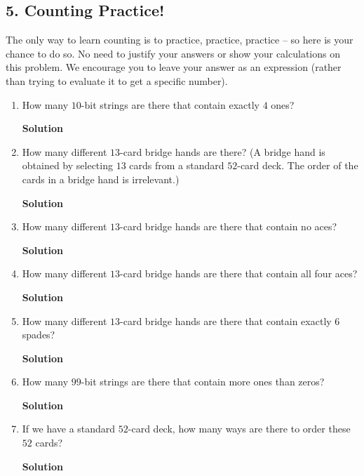 \documentclass{article}\usepackage{amsmath,amssymb,amsthm,tikz,tkz-graph,color,chngpage,soul,hyperref,csquotes,graphicx,floatrow}\newcommand*{\QEDB}{\hfill\ensuremath{\square}}\newtheorem*{prop}{Proposition}\renewcommand{\theenumi}{\alph{enumi}}\usepackage[shortlabels]{enumitem}\usepackage[nobreak=true]{mdframed}\usetikzlibrary{matrix,calc}\MakeOuterQuote{"}\usepackage[margin=0.75in]{geometry} \newtheorem{theorem}{Theorem}
\begin{document}
\subsection*{5. Counting Practice!}
The only way to learn counting is to practice, practice, practice -- so here is your chance to do so. No need to justify your answers or show your calculations on this problem. We encourage you to leave your answer as an expression (rather than trying to evaluate it to get a specific number).
\begin{enumerate}
\item How many $10$-bit strings are there that contain exactly $4$ ones?
\begin{mdframed}
\textbf{Solution}

\end{mdframed}
\item How many different $13$-card bridge hands are there? (A bridge hand is obtained by selecting $13$ cards from a standard $52$-card deck. The order of the cards in a bridge hand is irrelevant.)
\begin{mdframed}
\textbf{Solution}

\end{mdframed}
\item How many different $13$-card bridge hands are there that contain no aces?
\begin{mdframed}
\textbf{Solution}

\end{mdframed}
\item How many different $13$-card bridge hands are there that contain all four aces?
\begin{mdframed}
\textbf{Solution}

\end{mdframed}
\item How many different $13$-card bridge hands are there that contain exactly $6$ spades?
\begin{mdframed}
\textbf{Solution}

\end{mdframed}
\item How many $99$-bit strings are there that contain more ones than zeros?
\begin{mdframed}
\textbf{Solution}

\end{mdframed}
\item If we have a standard $52$-card deck, how many ways are there to order these $52$ cards?
\begin{mdframed}
\textbf{Solution}


\end{mdframed}
\end{enumerate}
\end{document}
